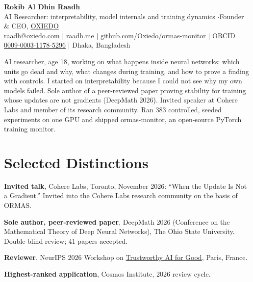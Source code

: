 \documentclass[10pt,a4paper]{article}
\begin{document}
\RaggedRight
\color{body}

\begin{center}
  {\LARGE\bfseries\color{heading} Rokib Al Dhin Raadh}\\[3pt]
  {\small AI Researcher: interpretability, model internals and training dynamics \enspace$\cdot$\enspace Founder \& CEO, \href{https://oxiedo.com}{OXIEDO}}\\[3pt]
  {\footnotesize
    \href{mailto:raadh@oxiedo.com}{raadh@oxiedo.com}
    \enspace$|$\enspace
    \href{https://www.raadh.me}{raadh.me}
    \enspace$|$\enspace
    \href{https://github.com/Oxiedo/ormas-monitor}{github.com/Oxiedo/ormas-monitor}
    \enspace$|$\enspace
    \href{https://orcid.org/0009-0003-1178-5296}{ORCID 0009-0003-1178-5296}
    \enspace$|$\enspace
    {\color{muted}Dhaka, Bangladesh}
  }
\end{center}
\vspace{1pt}

{\small\noindent AI researcher, age 18, working on what happens inside neural networks: which units go dead and why, what changes during training, and how to prove a finding with controls. I started on interpretability because I could not see why my own models failed. Sole author of a peer-reviewed paper proving stability for training whose updates are not gradients (DeepMath 2026). Invited speaker at Cohere Labs and member of its research community. Ran 383 controlled, seeded experiments on one GPU and shipped ormas-monitor, an open-source PyTorch training monitor.\par}

\section*{Selected Distinctions}
\begin{bullets}
  \item \textbf{Invited talk}, Cohere Labs, Toronto, November 2026: ``When the Update Is Not a Gradient.'' Invited into the Cohere Labs research community on the basis of ORMAS.
  \item \textbf{Sole author, peer-reviewed paper}, DeepMath 2026 (Conference on the Mathematical Theory of Deep Neural Networks), The Ohio State University. Double-blind review; 41 papers accepted.
  \item \textbf{Reviewer}, NeurIPS 2026 Workshop on \href{https://trustworthy-ai-for-good.github.io/}{Trustworthy AI for Good}, Paris, France.
  \item \textbf{Highest-ranked application}, Cosmos Institute, 2026 review cycle.
\end{bullets}
\end{document}
